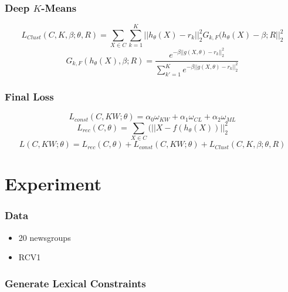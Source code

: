 \documentclass{beamer}
\begin{document}
\begin{frame}
  \frametitle{Deep $K$-Means }
\begin{equation*}
L_{Clust}(C, K, \beta; \theta, R) = \sum_{X \in C} \sum_{k=1}^K ||h_{\theta}(X) - r_k||_2^2 G_{k, F}(h_{\theta}(X)-\beta; R||_2^2
\end{equation*}
\begin{equation*}
G_{k, F}(h_{\theta}(X), \beta; R) = \frac{e^{-\beta ||g(X, \theta) - r_k||_2^2}}
{\sum_{k' = 1}^K e^{-\beta ||g(X, \theta) - r_k||_2^2}}
\end{equation*}
\end{frame}

\begin{frame}
\frametitle{Final Loss}
\begin{equation*}
  L_{const}(C, KW;\theta) = \alpha_0\omega_{KW} + \alpha_1\omega_{CL} + \alpha_2\omega_{ML}  
\end{equation*}
\pause
\begin{equation*}
  L_{rec}(C, \theta) = \sum_{X \in C}(||X - f(h_\theta(X))||_2^2
\end{equation*}
\pause
\begin{equation*}
  L(C,KW; \theta) = L_{rec}(C, \theta) + L_{const}(C, KW;\theta) + L_{Clust}(C, K, \beta; \theta, R)   
\end{equation*}
\end{frame}

\section{Experiment}

\begin{frame}
  \frametitle{Data}
  \begin{itemize}
    \setlength\itemsep{2em}
  \item 20 newsgroups
  \item RCV1 
  \end{itemize}
\end{frame}

\begin{frame}
\frametitle{Generate Lexical Constraints}
\end{frame}
\end{document}
